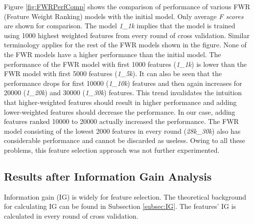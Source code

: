 Figure \ref{fig:FWRPerfComp} shows the comparison of performance of various FWR (Feature Weight Ranking) models with the initial model. Only average \textit{F scores} are shown for comparison. The model \textit{1\_1k} implies that the model is trained using 1000 highest weighted features from every round of cross validation. Similar terminology applies for the rest of the FWR models shown in the figure. None of the FWR models have a higher performance than the initial model. The performance of the FWR model with first 1000 features (\textit{1\_1k}) is lower than the FWR model with first 5000 features (\textit{1\_5k}). It can also be seen that the performance drops for first 10000 (\textit{1\_10k}) features and then again increases for 20000 (\textit{1\_20k}) and 30000 (\textit{1\_30k}) features. This trend invalidates the intuition that higher-weighted features should result in higher performance and adding lower-weighted features should decrease the performance. In our case, adding features ranked 10000 to 20000 actually increased the performance. The FWR model consisting of the lowest 2000 features in every round (\textit{28k\_30k}) also has considerable performance and cannot be discarded as useless. Owing to all these problems, this feature selection approach was not further experimented.

\subsection{Results after Information Gain Analysis}\label{subsec:SS_IG}

Information gain (IG) is widely for feature selection. The theoretical background for calculating IG can be found in Subsection \ref{subsec:IG}. The features' IG is calculated in every round of cross validation.

